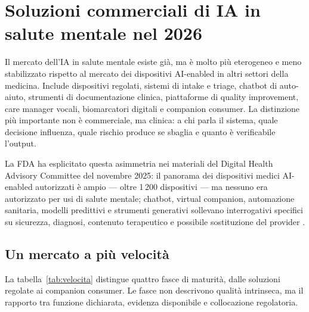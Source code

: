 \documentclass[11pt,a4paper]{article}
\begin{document}
\section{Soluzioni commerciali di IA in salute mentale nel 2026}
\label{sec:commerciale}

Il mercato dell'IA in salute mentale esiste già, ma è molto più eterogeneo e meno stabilizzato rispetto al mercato dei dispositivi AI-enabled in altri settori della medicina. Include dispositivi regolati, sistemi di intake e triage, chatbot di auto-aiuto, strumenti di documentazione clinica, piattaforme di quality improvement, care manager vocali, biomarcatori digitali e companion consumer. La distinzione più importante non è commerciale, ma clinica: a chi parla il sistema, quale decisione influenza, quale rischio produce se sbaglia e quanto è verificabile l'output.

La FDA ha esplicitato questa asimmetria nei materiali del Digital Health Advisory Committee del novembre 2025: il panorama dei dispositivi medici AI-enabled autorizzati è ampio --- oltre 1\,200 dispositivi --- ma nessuno era autorizzato per usi di salute mentale; chatbot, virtual companion, automazione sanitaria, modelli predittivi e strumenti generativi sollevano interrogativi specifici su sicurezza, diagnosi, contenuto terapeutico e possibile sostituzione del provider \cite{fda-dhac}.

\subsection{Un mercato a più velocità}

La tabella~\ref{tab:velocita} distingue quattro fasce di maturità, dalle soluzioni regolate ai companion consumer. Le fasce non descrivono qualità intrinseca, ma il rapporto tra funzione dichiarata, evidenza disponibile e collocazione regolatoria.
\end{document}
